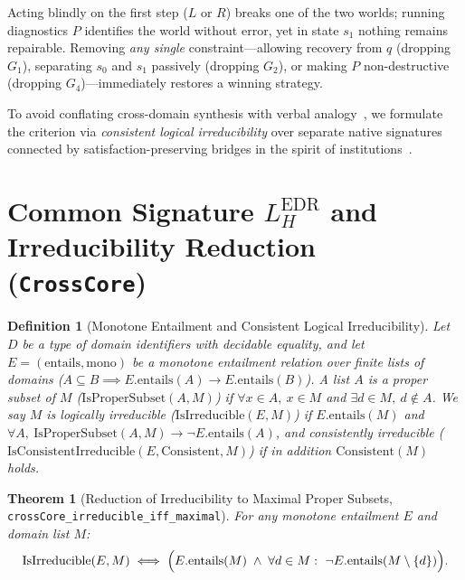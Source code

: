 \documentclass[10pt,a4paper]{article}
\theoremstyle{cleanthm}
\newtheorem{theorem}{Theorem}[section]
\theoremstyle{cleandef}
\newtheorem{definition}{Definition}[section]
\begin{document}
Acting blindly on the first step ($L$ or $R$) breaks one of the two worlds; running diagnostics $P$ identifies the world without error, yet in state $s_1$ nothing remains repairable. Removing \emph{any single} constraint—allowing recovery from $q$ (dropping $G_1$), separating $s_0$ and $s_1$ passively (dropping $G_2$), or making $P$ non-destructive (dropping $G_4$)—immediately restores a winning strategy.

To avoid conflating cross-domain synthesis with verbal analogy~\cite{gentner1983}, we formulate the criterion via \emph{consistent logical irreducibility} over separate native signatures connected by satisfaction-preserving bridges in the spirit of institutions~\cite{goguen1992}.

\section{Common Signature \texorpdfstring{$L_H^{\mathrm{EDR}}$}{L\_H\^{}EDR} and Irreducibility Reduction (\texorpdfstring{\texttt{CrossCore}}{CrossCore})}

\begin{definition}[Monotone Entailment and Consistent Logical Irreducibility]
Let $D$ be a type of domain identifiers with decidable equality, and let $E=(\mathrm{entails},\mathrm{mono})$ be a monotone entailment relation over finite lists of domains ($A\subseteq B\implies E.\mathrm{entails}(A)\to E.\mathrm{entails}(B)$). A list $A$ is a proper subset of $M$ ($\mathrm{IsProperSubset}(A,M)$) if $\forall x\in A,\ x\in M$ and $\exists d\in M,\ d\notin A$. We say $M$ is \emph{logically irreducible} ($\mathrm{IsIrreducible}(E,M)$) if $E.\mathrm{entails}(M)$ and $\forall A,\ \mathrm{IsProperSubset}(A,M)\to\neg E.\mathrm{entails}(A)$, and \emph{consistently irreducible} ($\mathrm{IsConsistentIrreducible}(E,\mathrm{Consistent},M)$) if in addition $\mathrm{Consistent}(M)$ holds.
\end{definition}

\begin{theorem}[Reduction of Irreducibility to Maximal Proper Subsets, \texttt{crossCore\_\allowbreak irreducible\_\allowbreak iff\_\allowbreak maximal}]
\label{thm:crosscore}
For any monotone entailment $E$ and domain list $M$:
\begin{equation}
  \mathrm{IsIrreducible}(E,M) \iff \Bigl(E.\mathrm{entails}(M) \;\land\; \forall d\in M:\ \neg E.\mathrm{entails}(M\setminus\{d\})\Bigr).
\end{equation}
\end{theorem}
\end{document}
